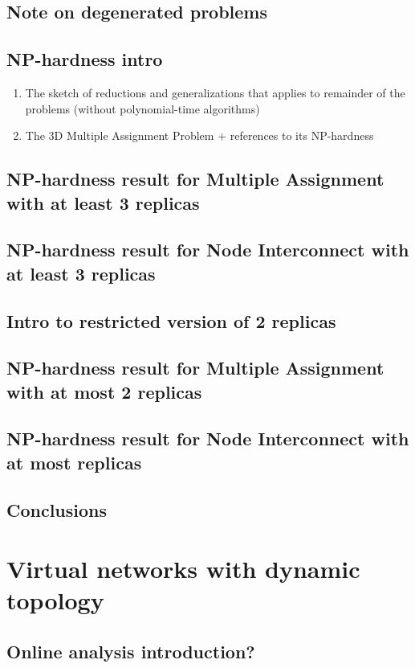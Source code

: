 \documentclass[a4paper]{book}
\begin{document}
\section{Note on degenerated problems}
\section{NP-hardness intro}
\begin{enumerate}
  \item The sketch of reductions and generalizations that applies to remainder of the problems (without polynomial-time algorithms)
  \item The 3D Multiple Assignment Problem + references to its NP-hardness
\end{enumerate}

\section{NP-hardness result for Multiple Assignment with at least 3 replicas}
\section{NP-hardness result for Node Interconnect with at least 3 replicas}

\section{Intro to restricted version of 2 replicas}

\section{NP-hardness result for Multiple Assignment with at most 2 replicas}
\section{NP-hardness result for Node Interconnect with at most replicas}

\section{Conclusions}

\chapter{Virtual networks with dynamic topology}

\section{Online analysis introduction?}
\end{document}
